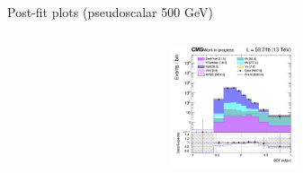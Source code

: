 \documentclass[8pt]{beamer}
\newcommand{\backupend}{
   \setcounter{framenumber}{\value{finalframe}}
}
\begin{document}
\begin{frame}{Post-fit plots (pseudoscalar 500 GeV)}
\begin{columns}
\begin{column}{0.33\textwidth}
\begin{center}
     			\includegraphics[width=1.0\textwidth, height=100pt]{figs/postfits/2018/log_cratio_TTbar_topCR_ll_BDT_ttDM500_TTbar_BDT_output_pseudoscalar500_customBinsAttempt7.png}
    		\end{center}		
		\end{column}
\end{columns} \vfill
\end{frame}

\backupend
\end{document}
